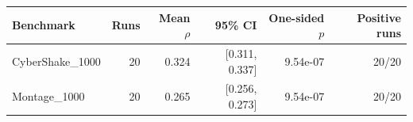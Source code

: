 \begin{tabular}{lrrrrr}
\toprule
Benchmark & Runs & Mean $\rho$ & 95\% CI & One-sided $p$ & Positive runs \\
\midrule
CyberShake\_1000 & 20 & 0.324 & [0.311, 0.337] & 9.54e-07 & 20/20 \\
Montage\_1000 & 20 & 0.265 & [0.256, 0.273] & 9.54e-07 & 20/20 \\
\bottomrule
\end{tabular}

